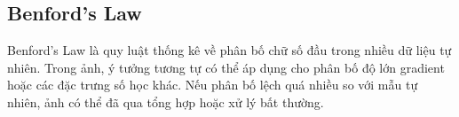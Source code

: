 \subsection{Benford's Law}
Benford's Law là quy luật thống kê về phân bố chữ số đầu trong nhiều dữ liệu tự nhiên. Trong ảnh, ý tưởng tương tự có thể áp dụng cho phân bố độ lớn gradient hoặc các đặc trưng số học khác. Nếu phân bố lệch quá nhiều so với mẫu tự nhiên, ảnh có thể đã qua tổng hợp hoặc xử lý bất thường.
